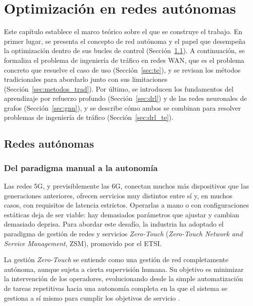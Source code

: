 \chapter{Optimización en redes autónomas}\label{cap:opt}

Este capítulo establece el marco teórico sobre el que se construye el trabajo. En primer lugar, se presenta el concepto de red autónoma y el papel que desempeña la optimización dentro de sus bucles de control (Sección~\ref{sec:redes_autonomas}). A continuación, se formaliza el problema de ingeniería de tráfico en redes WAN, que es el problema concreto que resuelve el caso de uso (Sección~\ref{sec:te}), y se revisan los métodos tradicionales para abordarlo junto con sus limitaciones (Sección~\ref{sec:metodos_trad}). Por último, se introducen los fundamentos del aprendizaje por refuerzo profundo (Sección~\ref{sec:drl}) y de las redes neuronales de grafos (Sección~\ref{sec:gnn}), y se describe cómo ambos se combinan para resolver problemas de ingeniería de tráfico (Sección~\ref{sec:drl_te}).

\section{Redes autónomas}\label{sec:redes_autonomas}

\subsection{Del paradigma manual a la autonomía}

Las redes 5G, y previsiblemente las 6G, conectan muchos más dispositivos que las generaciones anteriores, ofrecen servicios muy distintos entre sí y, en muchos casos, con requisitos de latencia estrictos. Operarlas a mano o con configuraciones estáticas deja de ser viable: hay demasiados parámetros que ajustar y cambian demasiado deprisa. Para abordar este desafío, la industria ha adoptado el paradigma de gestión de redes y servicios \textit{Zero-Touch} (\textit{Zero-Touch Network and Service Management}, ZSM), promovido por el ETSI.

La gestión \textit{Zero-Touch} se entiende como una gestión de red completamente autónoma, aunque sujeta a cierta supervisión humana. Su objetivo es minimizar la intervención de los operadores, evolucionando desde la simple automatización de tareas repetitivas hacia una autonomía completa en la que el sistema se gestiona a sí mismo para cumplir los objetivos de servicio \cite{coronado2022zero}.

